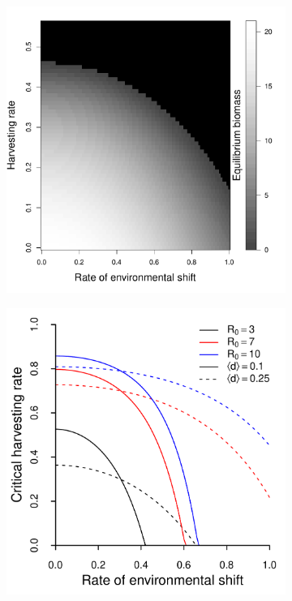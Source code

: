 \documentclass[]{article}
\begin{document}
\begin{figure}[htbp]
\begin{subfigure}{3in}
\subcaption{\label{biomass}}
\includegraphics[width=\textwidth]{plots/eqbiomass.pdf}
\end{subfigure}
\begin{subfigure}{3in}
\subcaption{\label{rates}}
\includegraphics[width=\textwidth]{plots/critical_rates.pdf}

\end{subfigure}
\end{figure}
\end{document}
